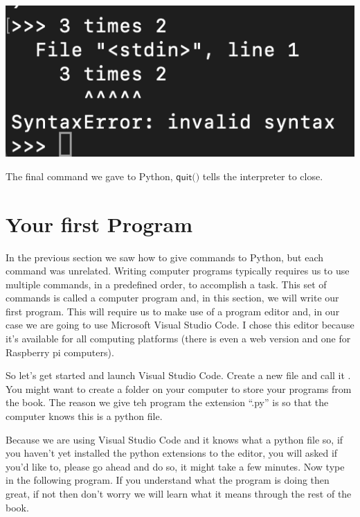 \begin{center}
    \includegraphics[width=0.3\linewidth]{images/screenshots/SyntaxError.png}
\end{center}

The final command we gave to Python, $\textsf{quit()}$ tells the interpreter to close.

\section{Your first Program}

In the previous section we saw how to give commands to Python, but each command was unrelated. Writing computer programs typically requires us to use multiple commands, in a predefined order, to accomplish a task. This set of commands is called a computer program and, in this section, we will write our first program. This will require us to make use of a program editor and, in our case we are going to use Microsoft Visual Studio Code. I chose this editor because it's available for all computing platforms (there is even a web version and one for Raspberry pi computers).

So let's get started and launch Visual Studio Code. Create a new file and call it . You might want to create a folder on your computer to store your programs from the book. The reason we give teh program the extension ``.py'' is so that the computer knows this is a python file.

Because we are using Visual Studio Code and it knows what a python file so, if you haven't yet installed the python extensions to the editor, you will asked if you'd like to, please go ahead and do so, it might take a few minutes. Now type in the following program. If you understand what the program is doing then great, if not then don't worry we will learn what it means through the rest of the book.

\begin{minipage}{\textwidth}

\end{minipage}

